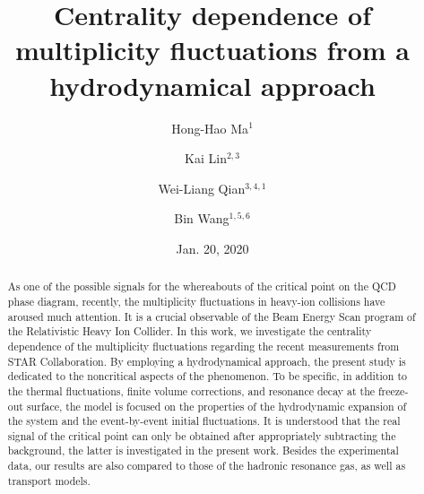 \documentclass[secnumarabic, graphics,floatfix, nofootinbib,tightenlines,nobibnotes, aps, prl, 12pt]{revtex4-1}
\begin{document}
\title{Centrality dependence of multiplicity fluctuations from a hydrodynamical approach}

\author{Hong-Hao Ma$^{1}$}
\author{Kai Lin$^{2,3}$}
\author{Wei-Liang Qian$^{3,4,1}$}
\author{Bin Wang$^{1,5,6}$}



\date{Jan. 20, 2020}

\begin{abstract}

As one of the possible signals for the whereabouts of the critical point on the QCD phase diagram, recently, the multiplicity fluctuations in heavy-ion collisions have aroused much attention.
It is a crucial observable of the Beam Energy Scan program of the Relativistic Heavy Ion Collider.
In this work, we investigate the centrality dependence of the multiplicity fluctuations regarding the recent measurements from STAR Collaboration.
By employing a hydrodynamical approach, the present study is dedicated to the noncritical aspects of the phenomenon.
To be specific, in addition to the thermal fluctuations, finite volume corrections, and resonance decay at the freeze-out surface, the model is focused on the properties of the hydrodynamic expansion of the system and the event-by-event initial fluctuations.
It is understood that the real signal of the critical point can only be obtained after appropriately subtracting the background, the latter is investigated in the present work.
Besides the experimental data, our results are also compared to those of the hadronic resonance gas, as well as transport models.


\end{abstract}
\end{document}
